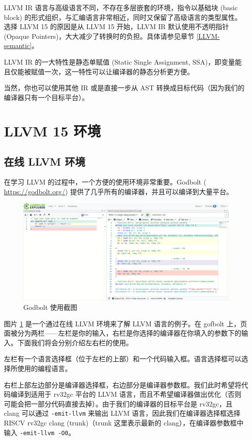 LLVM IR 语言与高级语言不同，不存在多层嵌套的环境，指令以基础块 (basic block)
的形式组织，与汇编语言非常相近，同时又保留了高级语言的类型属性。选择 LLVM 15
的原因是从 LLVM 15 开始，LLVM IR 默认使用不透明指针
(Opaque Pointers)，大大减少了转换时的负担。具体请参见章节 \ref{LLVM-semantic}。

LLVM IR 的一大特性是静态单赋值 (Static Single Assignment,
SSA)，即变量能且仅能被赋值一次，这一特性可以让编译器的静态分析更方便。

当然，你也可以使用其他 IR 或是直接一步从 AST
转换成目标代码（因为我们的编译器只有一个目标平台）。

\section{LLVM 15 环境}

\subsection{在线 LLVM 环境}\label{online-LLVM-env}

在学习 LLVM 的过程中，一个方便的使用环境非常重要。Godbolt (
\url{https://godbolt.org/}) 提供了几乎所有的编译器，并且可以编译到大量平台。

\begin{figure}[htb]
\centering
\includegraphics[scale=0.3]{image/godbolt.png}
\caption{Godbolt 使用截图}
\label{godbolt_sreenshot}
\end{figure}

图片 \ref{godbolt_sreenshot} 是一个通过在线 LLVM 环境来了解 LLVM 语言的例子。在
gofbolt 上，页面被分为两栏——左栏是你的输入，右栏是你选择的编译器在你填入的参数下的输入。下面我们将会分别介绍左右栏的使用。

左栏有一个语言选择框（位于左栏的上部）和一个代码输入框。语言选择框可以选择所使用的编程语言。

右栏上部左边部分是编译器选择框，右边部分是编译器参数框。我们此时希望将代码编译到适用于 rv32gc
平台的 LLVM 语言，而且不希望编译器做出优化（否则可能会把一部分代码直接去掉）。由于我们的编译器的目标平台是
rv32gc，且 clang 可以通过 \texttt{-emit-llvm} 来输出 LLVM 语言，因此我们在编译器选择框选择
RISCV rv32gc clang (trunk)（trunk 这里表示最新的 clang），在编译器参数框中输入 \texttt{-emit-llvm -O0}。

